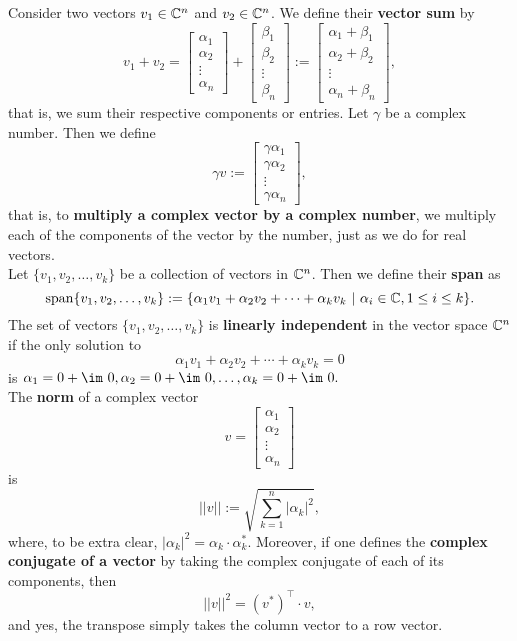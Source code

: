 Consider two vectors $v_1\in \mathbb C^n$ and $v_2\in \mathbb C^n$. We define their \textbf{vector sum} by 
$$v_1+v_2=\begin{bmatrix} \alpha_1 \\ \alpha_2 \\ \vdots \\ \alpha_n\end{bmatrix}+  \begin{bmatrix} \beta_1 \\ \beta_2 \\ \vdots \\ \beta_n\end{bmatrix}:=\begin{bmatrix} \alpha_1 + \beta_1 \\ \alpha_2 + \beta_2 \\ \vdots \\ \alpha_n + \beta_n\end{bmatrix},$$
that is, we sum their respective components or entries. 
Let $\gamma$ be a complex number. Then we define 
$$\gamma v := \begin{bmatrix} \gamma \alpha_1 \\ \gamma \alpha_2 \\ \vdots \\\gamma \alpha_n\end{bmatrix}, $$
that is, to \textbf{multiply a complex vector by a complex number}, we multiply each of the components of the vector by the number, just as we do for real vectors.\\

Let $\{ v_1, v_2, \ldots, v_k\}$ be a collection of vectors in $\mathbb C^n$. Then we define their \textbf{span} as 
$$\mathrm{span} \{ v_1, v_2, \ldots, v_k \}:=\{ \alpha_1 v_1 + \alpha_2 v_2 + \cdots + \alpha_k v_k~|~ \alpha_i \in \mathbb C, 1 \le i \le k\}. $$
The set of vectors  $\{ v_1, v_2, \ldots, v_k\}$ is \textbf{linearly independent} in the vector space $\mathbb C^n$ if the only solution to 
$$\alpha_1 v_1 + \alpha_2 v_2 + \cdots + \alpha_k v_k=0 $$
is $\alpha_1=0 + \im~0, \alpha_2=0 + \im~0, \ldots, \alpha_k=0 + \im~0.$\\

The \textbf{norm} of a complex vector 
$$v=\begin{bmatrix} \alpha_1 \\ \alpha_2 \\ \vdots \\ \alpha_n\end{bmatrix}$$
is 
$$||v||:= \sqrt{\sum_{k=1}^{n} |\alpha_k|^2},$$
where, to be extra clear, $|\alpha_k|^2=\alpha_k \cdot \alpha_k^\ast.$ Moreover, if one defines the \textbf{complex conjugate of a vector} by taking the complex conjugate of each of its components, then 
$$||v||^2 = \left( v^\ast \right)^\top \cdot v, $$
and yes, the transpose simply takes the column vector to a row vector. 





